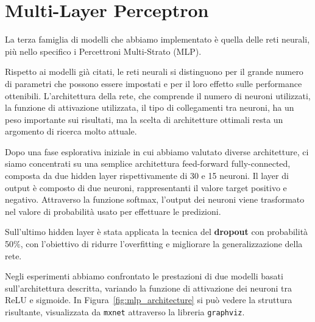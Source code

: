 \section{Multi-Layer Perceptron}
La terza famiglia di modelli che abbiamo implementato è quella delle reti 
neurali, più nello specifico i Percettroni Multi-Strato (MLP).

Rispetto ai modelli già citati, le reti neurali si distinguono per il grande 
numero di parametri che possono essere impostati e per il loro effetto sulle 
performance ottenibili. L'architettura della rete, che comprende il numero di 
neuroni utilizzati, la funzione di attivazione utilizzata, il tipo di 
collegamenti tra neuroni, ha un peso importante sui risultati, ma la scelta di 
architetture ottimali resta un argomento di ricerca molto attuale.

Dopo una fase esplorativa iniziale in cui abbiamo valutato diverse 
architetture, ci siamo concentrati su una semplice architettura feed-forward 
fully-connected, composta da due hidden layer rispettivamente di 30 e 15 
neuroni. Il layer di output è composto di due neuroni, rappresentanti il valore 
target positivo e negativo. Attraverso la funzione softmax, l'output dei 
neuroni viene trasformato nel valore di probabilità usato per effettuare le 
predizioni.

Sull'ultimo hidden layer è stata applicata la tecnica del \textbf{dropout} con 
probabilità 50\%, con l'obiettivo di ridurre l'overfitting e migliorare la 
generalizzazione della rete.

Negli esperimenti abbiamo confrontato le prestazioni di due modelli basati 
sull'architettura descritta, variando la funzione di attivazione dei neuroni 
tra ReLU e sigmoide. In Figura~\ref{fig:mlp_architecture} si può vedere la 
struttura risultante, visualizzata da \texttt{mxnet} attraverso la libreria 
\texttt{graphviz}.

